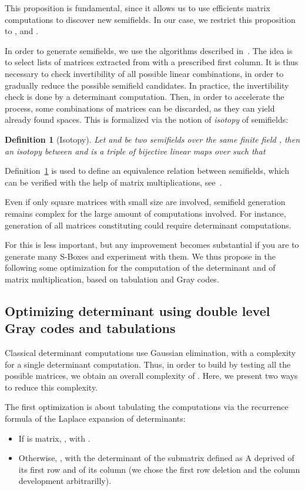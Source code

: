\documentclass{article}\usepackage{amsthm}
\newtheorem{mydef}{Definition}
\newcommand{\SBoxes}{S-Boxes\xspace}
\begin{document}
This proposition is fundamental, since it allows us to use efficients matrix computations to discover new semifields.
In our case, we restrict this proposition to , and . 

In order to generate semifields, we use the algorithms described in~\cite{Rua:2009:classification_sf}. 
The idea is to select lists of matrices extracted from  with a prescribed first column.
It is thus necessary to check invertibility of all possible linear combinations, in order to gradually reduce the possible semifield candidates.
In practice, the invertibility check is done by a determinant computation.
Then, in order to accelerate the process, some combinations of matrices can be discarded, as they can yield already found spaces. This is formalized via the notion of {\em isotopy} of semifields:
\begin{mydef}[Isotopy]\label{def:isotopy}
Let and  be two semifields over the same finite field , then an isotopy between  and  is a triple  of bijective linear maps  over  such that 
\end{mydef}
Definition~\ref{def:isotopy} is used to define an equivalence relation between semifields, which can be verified with the help of matrix multiplications, see~\cite[Prop. 2]{Combarro:2011:advances_sf}.





Even if only square matrices with small size are involved, semifield generation remains complex for the large amount of computations involved. 
For instance, generation of all matrices constituting  could require  determinant computations. 

For  this is less important, but any improvement becomes substantial
if you are to generate many \SBoxes and experiment with them. We thus propose in
the following some optimization for the computation of the determinant and of
matrix multiplication, based on tabulation and Gray codes. 

\subsection{Optimizing determinant using double level Gray codes and tabulations}
Classical determinant computations use Gaussian elimination, with a  complexity for a single determinant computation. 
Thus, in order to build  by testing all the possible matrices, we obtain an overall complexity of . 
Here, we present two ways to reduce this complexity.

The first optimization is about tabulating the computations via the recurrence
formula of the Laplace expansion of determinants:
\begin{itemize}
	\item If  is  matrix, , with .
	\item Otherwise, ,   with  the determinant of the submatrix defined as A deprived of its first row and of its  column (we chose the first row deletion and the column development arbitrarilly). 
\end{itemize}
		
\end{document}
